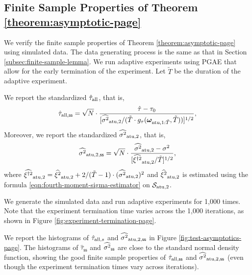 \clearpage

\subsection{Finite Sample Properties of Theorem \ref{theorem:asymptotic-page}}\label{subsec:finite-sample-pgae}

We verify the finite sample properties of Theorem \ref{theorem:asymptotic-page} using simulated data. The data generating process is the same as that in Section \ref{subsec:finite-sample-lemma}. We run adaptive experiments using PGAE that allow for the early termination of the experiment. Let $\tilde{T}$ be the duration of the adaptive experiment.

We report the standardized $\hat{\tau}_{\mathrm{all}}$, that is, 
\[ \hat{\tau}_{\mathrm{all},{\mathsf{ss}}} =  \sqrt{N} \cdot \frac{\hat{\tau} - \tau_0}{[\widehat{\sigma^2}_{\mathrm{atu},2} /(\tilde{T} \cdot g_\tau(\bm{\omega}_{\mathrm{ntu}, 1:\tilde{T}}, \tilde{T}))]^{1/2}}, \]
Moreover, we report the standardized $\widehat{\sigma^2}_{\mathrm{atu},2}$, that is, \[\widehat{\sigma^2}_{\mathrm{atu},2,{\mathsf{ss}}} =  \sqrt{N} \cdot \frac{\widehat{\sigma^2}_{\mathrm{atu},2} - \sigma^2}{[\widehat{\xi^{\dagger 2}}_{\mathrm{atu},2}/\tilde{T}]^{1/2} }, \]
where $\widehat{\xi^{\dagger 2}}_{\mathrm{atu},2} = \widehat{\xi^2}_{\mathrm{atu},2} + {2}/{(\tilde{T}-1)} \cdot (\widehat{\sigma^2}_{\mathrm{atu},2})^2$ and $\widehat{\xi^2}_{\mathrm{atu},2}$ is estimated using the formula \eqref{eqn:fourth-moment-sigma-estimator} on $\mathcal{S}_{\mathrm{atu},2}$. 

We generate the simulated data and run adaptive experiments for 1,000 times. Note that the experiment termination time varies across the 1,000 iterations, as shown in Figure \ref{fig:experiment-termination-page}. 


We report the histograms of $\hat{\tau}_{\mathrm{all},s}$ and $\widehat{\sigma^2}_{\mathrm{atu},2,{\mathsf{ss}}}$ in Figure \ref{fig:test-asymptotics-page}. The histograms of $\hat{\tau}_{\mathsf{ss}}$ and  $\widehat{\sigma^2}_{\mathsf{ss}}$ are close to the standard normal density function, showing the good finite sample properties of $\hat{\tau}_{\mathrm{all},{\mathsf{ss}}}$ and $\widehat{\sigma^2}_{\mathrm{atu},2,{\mathsf{ss}}}$ (even though the experiment termination times vary across iterations). 

